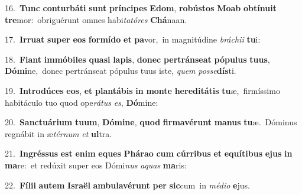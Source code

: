 {{\numbfont\textcolor{\numbcolor}{16.}}~\textbf{Tunc} \textbf{con}\-\textbf{tur}\textbf{bá}\textbf{ti} \textbf{sunt} \textbf{prín}\-\textbf{ci}\textbf{pes} \textbf{E}\-\textbf{dom}, \textbf{ro}\-\textbf{bús}\textbf{tos} \textbf{Mo}\-\textbf{ab} \textbf{ob}\-\textbf{tí}\textbf{nu}\textbf{it} \textbf{tre}\-mor:~\star obriguérunt omnes habi\-\textit{ta}\-\textit{tó}\textit{res} \textbf{Chá}\-naan.\par
{\numbfont\textcolor{\numbcolor}{17.}}~\-\textbf{Ir}\-\textbf{ru}\textbf{at} \textbf{su}\-\textbf{per} \textbf{e}\-\textbf{os} \textbf{for}\-\textbf{mí}\textbf{do} \textbf{et} \textbf{pa}\-vor,~\star in magnitúdine \textit{brá}\-\textit{chi}\textit{i} \textbf{tu}\-i:\par
{\numbfont\textcolor{\numbcolor}{18.}}~\-\textbf{Fi}\-\textbf{ant} \textbf{im}\-\textbf{mó}\textbf{bi}\textbf{les} \textbf{qua}\-\textbf{si} \textbf{la}\-\textbf{pis}, \textbf{do}\-\textbf{nec} \textbf{per}\-\textbf{tráns}\textbf{e}\textbf{at} \textbf{pó}\-\textbf{pu}\textbf{lus} \textbf{tu}\-\textbf{us}, \textbf{Dó}\-\textbf{mi}ne,~\star donec pertránseat pópulus tuus iste, \textit{quem} \textit{pos}\-\textit{se}\textbf{dís}ti.\par
{\numbfont\textcolor{\numbcolor}{19.}}~\-\textbf{In}\-\textbf{tro}\textbf{dú}\textbf{ces} \textbf{e}\-\textbf{os}, \textbf{et} \textbf{plan}\-\textbf{tá}\textbf{bis} \textbf{in} \textbf{mon}\-\textbf{te} \textbf{he}\-\textbf{re}\textbf{di}\textbf{tá}\textbf{tis} \textbf{tu}\-æ,~\star firmíssimo habitáculo tuo quod ope\-\textit{rá}\-\textit{tus} \textit{es}\-, \textbf{Dó}\-mine:\par
{\numbfont\textcolor{\numbcolor}{20.}}~\-\textbf{Sanc}\-\textbf{tu}\textbf{á}\textbf{ri}\textbf{um} \textbf{tu}\-\textbf{um}, \textbf{Dó}\-\textbf{mi}\textbf{ne}, \textbf{quod} \textbf{fir}\-\textbf{ma}\textbf{vé}\textbf{runt} \textbf{ma}\-\textbf{nus} \textbf{tu}\-æ.~\star Dóminus regnábit in æ\-\textit{tér}\-\textit{num} \textit{et} \textbf{ul}\-tra.\par
{\numbfont\textcolor{\numbcolor}{21.}}~\-\textbf{In}\-\textbf{grés}\textbf{sus} \textbf{est} \textbf{e}\-\textbf{nim} \textbf{e}\-\textbf{ques} \textbf{Phá}\-\textbf{ra}\textbf{o} \textbf{cum} \textbf{cúr}\-\textbf{ri}\textbf{bus} \textbf{et} \textbf{e}\-\textbf{quí}\textbf{ti}\textbf{bus} \textbf{e}\-\textbf{jus} \textbf{in} \textbf{ma}\-re:~\star et redúxit super eos Dómi\textit{nus} \textit{a}\-\textit{quas} \textbf{ma}\-ris:\par
{\numbfont\textcolor{\numbcolor}{22.}}~\-\textbf{Fí}\-\textbf{li}\textbf{i} \textbf{au}\-\textbf{tem} \textbf{Is}\-\textbf{ra}\textbf{ël} \textbf{am}\-\textbf{bu}\textbf{la}\textbf{vé}\textbf{runt} \textbf{per} \textbf{sic}\-cum~\star in \textit{mé}\-\textit{di}\textit{o} \textbf{e}\-jus.\par
}
